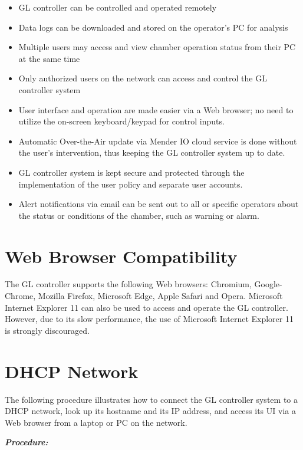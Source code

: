 \begin{itemize}
\item
  GL controller can be controlled and operated remotely
\item
  Data logs can be downloaded and stored on the operator's PC for
  analysis
\item
  Multiple users may access and view chamber operation status from their
  PC at the same time
\item
  Only authorized users on the network can access and control the GL
  controller system
\item
  User interface and operation are made easier via a Web browser; no
  need to utilize the on-screen keyboard/keypad for control inputs.
\item
  Automatic Over-the-Air update via Mender IO cloud service is done
  without the user's intervention, thus keeping the GL controller system
  up to date.
\item
  GL controller system is kept secure and protected through the
  implementation of the user policy and separate user accounts.
\item
  Alert notifications via email can be sent out to all or specific
  operators about the status or conditions of the chamber, such as
  warning or alarm.
\end{itemize}


\section{Web Browser
Compatibility}

The GL controller supports the following Web browsers: Chromium,
Google-Chrome, Mozilla Firefox, Microsoft Edge, Apple Safari and Opera.
Microsoft Internet Explorer 11 can also be used to access and operate
the GL controller. However, due to its slow performance, the use of
Microsoft Internet Explorer 11 is strongly discouraged.


\section{DHCP Network}

The following procedure illustrates how to connect the GL controller
system to a DHCP network, look up its hostname and its IP address, and
access its UI via a Web browser from a laptop or PC on the network.

\pagebreak 

\textbf{\emph{Procedure:}}

